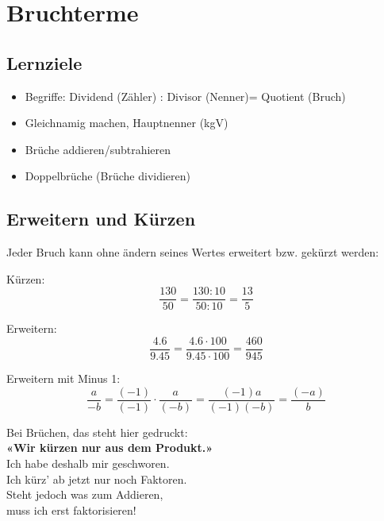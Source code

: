 \newpage
\section{Bruchterme}

\subsection*{Lernziele}

\begin{itemize}
	\item Begriffe: Dividend (Zähler) : Divisor (Nenner)= Quotient (Bruch)
	\item Gleichnamig machen, Hauptnenner (kgV)
	\item Brüche addieren/subtrahieren
	\item Doppelbrüche (Brüche dividieren) 
\end{itemize}

\subsection{Erweitern und Kürzen}
Jeder Bruch kann ohne ändern seines Wertes erweitert bzw. gekürzt
werden:

Kürzen:
$$\frac{130}{50} = \frac{130 : 10}{50:10} =\frac{13}{5}$$

Erweitern:
$$\frac{4.6}{9.45} = \frac{4.6 \cdot{}100}{9.45\cdot{}100} =
\frac{460}{945}$$

Erweitern mit Minus 1:
$$\frac{a}{-b}
=\frac{(-1)}{(-1)} \cdot{}\frac{a}{(-b)}
= \frac{(-1)a}{(-1)(-b)}
= \frac{(-a)}{b}$$

\begin{rezept}{}{}

\begin{center}Bei Brüchen, das steht hier gedruckt:\\
\textbf{«Wir kürzen nur aus dem Produkt.»}\\

Ich habe deshalb mir geschworen.\\
Ich kürz' ab jetzt nur noch Faktoren.\\

Steht jedoch was zum Addieren,\\
muss ich erst faktorisieren!\\
\end{center}
\end{rezept}

